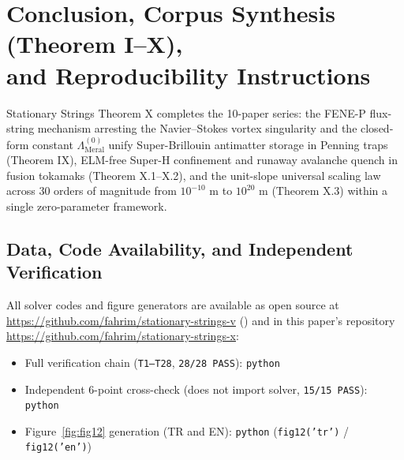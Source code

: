 \documentclass[12pt,a4paper]{article}
\begin{document}
\clearpage

\section[Conclusion, Corpus Synthesis, and Reproducibility]{Conclusion, Corpus Synthesis (Theorem I--X), \\ and Reproducibility Instructions}

Stationary Strings Theorem X completes the 10-paper series: the FENE-P flux-string mechanism arresting the Navier--Stokes vortex singularity and the closed-form constant $\Lambda_{\mathrm{Meral}}^{(0)}$ unify Super-Brillouin antimatter storage in Penning traps (Theorem IX), ELM-free Super-H confinement and runaway avalanche quench in fusion tokamaks (Theorem X.1--X.2), and the unit-slope universal scaling law across 30 orders of magnitude from $10^{-10}\text{ m}$ to $10^{20}\text{ m}$ (Theorem X.3) within a single zero-parameter framework.

\subsection*{Data, Code Availability, and Independent Verification}
All solver codes and figure generators are available as open source at \url{https://github.com/fahrim/stationary-strings-v} () and in this paper's repository \url{https://github.com/fahrim/stationary-strings-x}:
\begin{itemize}
    \item Full verification chain (\texttt{T1--T28}, \texttt{28/28 PASS}): \texttt{python} 
    \item Independent 6-point cross-check (does not import solver, \texttt{15/15 PASS}): \texttt{python} 
    \item Figure~\ref{fig:fig12} generation (TR and EN): \texttt{python}  (\texttt{fig12('tr')} / \texttt{fig12('en')})
\end{itemize}
\end{document}
